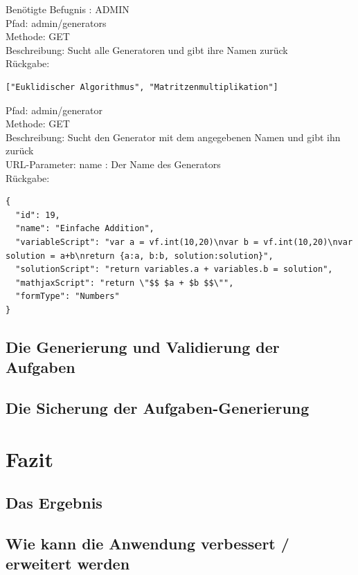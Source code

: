Benötigte Befugnis : ADMIN \\

\noindent Pfad: admin/generators \\
Methode: GET \\
Beschreibung: Sucht alle Generatoren und gibt ihre Namen zurück \\
Rückgabe: \begin{lstlisting} 
["Euklidischer Algorithmus", "Matritzenmultiplikation"]
\end{lstlisting}

\noindent Pfad: admin/generator \\
Methode: GET \\
Beschreibung: Sucht den Generator mit dem angegebenen Namen und gibt ihn zurück \\
URL-Parameter: name : Der Name des Generators \\
Rückgabe: \begin{lstlisting} 
{
  "id": 19,
  "name": "Einfache Addition",
  "variableScript": "var a = vf.int(10,20)\nvar b = vf.int(10,20)\nvar solution = a+b\nreturn {a:a, b:b, solution:solution}",
  "solutionScript": "return variables.a + variables.b = solution",
  "mathjaxScript": "return \"$$ $a + $b $$\"",
  "formType": "Numbers"
}
\end{lstlisting}


\section{Die Generierung und Validierung der Aufgaben}



\section{Die Sicherung der Aufgaben-Generierung}



\chapter{Fazit}




\section{Das Ergebnis}


\section{Wie kann die Anwendung verbessert / erweitert werden}

